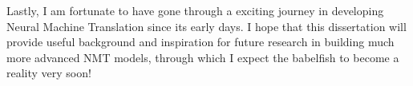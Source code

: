 Lastly, I am fortunate to have gone through a exciting journey in developing Neural Machine Translation since its early days. I hope that this dissertation will provide useful background and inspiration for future research in building much more advanced NMT models, through which I expect the babelfish to become a reality very soon!
